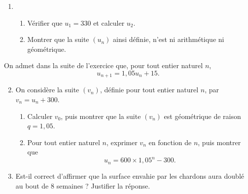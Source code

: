 \documentclass[11pt]{article}
\begin{document}
\begin{enumerate}
  \item \begin{enumerate}
      \item Vérifier que $u_1=330$ et calculer $u_2$.
      \item Montrer que la suite $(u_n)$ ainsi définie, n'est ni arithmétique ni
        géométrique.
    \end{enumerate}
\end{enumerate}
On admet dans la suite de l'exercice que, pour tout entier naturel $n$,
\[
  u_{n+1} = 1,05u_n+15.
\]
\begin{enumerate}
    \setcounter{enumi}{1}
  \item On considère la suite $(v_n)$, définie pour tout entier naturel $n$, par
    $v_n=u_n+300$.
    \begin{enumerate}
      \item Calculer $v_0$, puis montrer que la suite $(v_n)$ est géométrique de
        raison $q=1,05$.
      \item Pour tout entier naturel $n$, exprimer $v_n$ en fonction de $n$,
        puis montrer que
        \[
          u_n = 600\times1,05^n-300.
        \]
    \end{enumerate}
  \item Est-il correct d'affirmer que la surface envahie par les chardons aura
    doublé au bout de $8$ semaines ? Justifier la réponse.
\end{enumerate}
\end{document}

